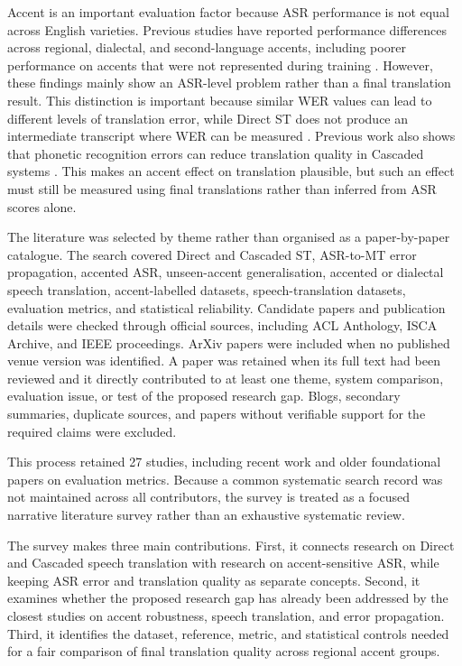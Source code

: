 Accent is an important evaluation factor because ASR performance is not equal
across English varieties. Previous studies have reported performance
differences across regional, dialectal, and second-language accents, including
poorer performance on accents that were not represented during training
\cite{dichristofano2022global,jahan2025unveiling,shi2021aesrc,
prabhu2023accentcodebooks}. However, these findings mainly show an ASR-level
problem rather than a final translation result. This distinction is important
because similar WER values can lead to different levels of translation error,
while Direct ST does not produce an intermediate transcript where WER can be
measured \cite{le2017disentangling}. Previous work also shows that phonetic
recognition errors can reduce translation quality in Cascaded systems
\cite{sperber2019,pida2026}. This makes an accent effect on translation
plausible, but such an effect must still be measured using final translations
rather than inferred from ASR scores alone.

The literature was selected by theme rather than organised as a paper-by-paper
catalogue. The search covered Direct and Cascaded ST, ASR-to-MT error
propagation, accented ASR, unseen-accent generalisation, accented or dialectal
speech translation, accent-labelled datasets, speech-translation datasets,
evaluation metrics, and statistical reliability. Candidate papers and
publication details were checked through official sources, including ACL
Anthology, ISCA Archive, and IEEE proceedings. ArXiv papers were included when
no published venue version was identified. A paper was retained when its full
text had been reviewed and it directly contributed to at least one theme,
system comparison, evaluation issue, or test of the proposed research gap.
Blogs, secondary summaries, duplicate sources, and papers without verifiable
support for the required claims were excluded.

This process retained 27 studies, including recent work and older foundational
papers on evaluation metrics. Because a common systematic search record was
not maintained across all contributors, the survey is treated as a focused
narrative literature survey rather than an exhaustive systematic review.

The survey makes three main contributions. First, it connects research on
Direct and Cascaded speech translation with research on accent-sensitive ASR,
while keeping ASR error and translation quality as separate concepts. Second,
it examines whether the proposed research gap has already been addressed by
the closest studies on accent robustness, speech translation, and error
propagation. Third, it identifies the dataset, reference, metric, and
statistical controls needed for a fair comparison of final translation quality
across regional accent groups.


